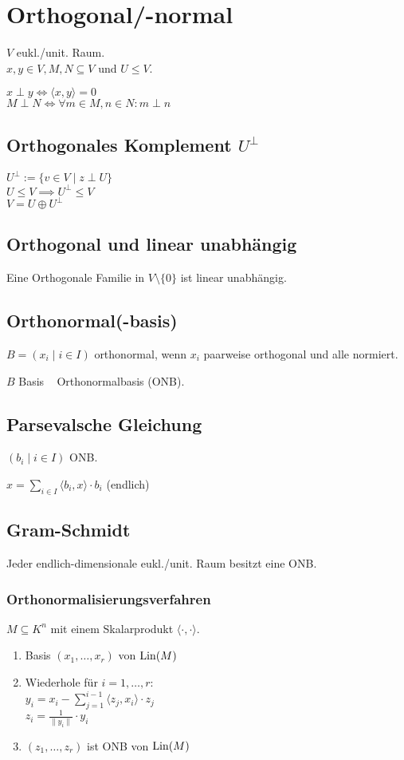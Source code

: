 \section*{Orthogonal/-normal}
$V$ eukl./unit. Raum. \\
$x,y\in V,M,N\subseteq V$ und $U \le V$.

$x\perp y \iff \langle x,y \rangle = 0$ \\
$M \perp N \iff \forall m\in M, n\in N: m \perp n$

\subsection*{Orthogonales Komplement $U^\perp$}
$U^\perp := \{v \in V \mid z \perp U\}$ \\
$U \le V \implies U^\perp \le V$ \\
$V = U \oplus U^\perp$

\subsection*{Orthogonal und linear unabhängig}
Eine Orthogonale Familie in $V\setminus\{0\}$ ist linear unabhängig.

\subsection*{Orthonormal(-basis)}
$B=(x_i \mid i\in I)$ orthonormal, wenn
$x_i$ paarweise orthogonal und alle normiert.

$B$ Basis \rightarrow~ Orthonormalbasis (ONB).

\subsection*{Parsevalsche Gleichung}
$(b_i \mid i\in I)$ ONB.

$\displaystyle x=\sum_{i\in I}\langle b_i,x \rangle\cdot b_i$ (endlich)

\subsection*{Gram-Schmidt}
Jeder endlich-dimensionale eukl./unit. Raum besitzt eine ONB.

\subsubsection*{Orthonormalisierungsverfahren}
$M\subseteq K^n$ mit einem Skalarprodukt $\langle\cdot,\cdot\rangle$.
\begin{enumerate}
	\item Basis $(x_1,\dots,x_r)$ von $\operatorname{Lin}(M)$
	\item Wiederhole für $i=1,\dots,r$: \\
		$\displaystyle y_i = x_i - \sum_{j=1}^{i-1}\langle z_j,x_i \rangle\cdot z_j$ \\
		$\displaystyle z_i = \frac{1}{\|y_i\|}\cdot y_i$
	\item $(z_1,\dots,z_r)$ ist ONB von $\operatorname{Lin}(M)$
\end{enumerate}

